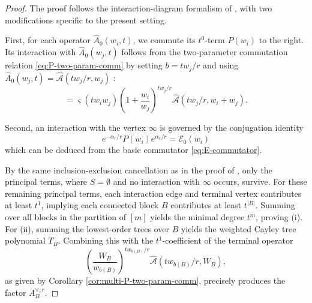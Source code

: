 \documentclass[letterpaper,12pt]{amsart}
\theoremstyle{definition}
\newcommand{\Ecal}{\mathcal E}
\newcommand{\vars}{\varsigma}
\numberwithin{equation}{section}
\begin{document}
\begin{proof}
The proof follows the interaction-diagram formalism of \cite{OP3}, with two modifications specific to the present setting.

First, for each operator $\widehat A_0(w_i,t)$, we commute its  $t^0$-term $P(w_i)$ to the right. Its interaction with $\widehat A_0(w_j,t)$ follows from the two-parameter commutation relation \eqref{eq:P-two-param-comm} by setting $b=tw_j/r$ and using \( 
\widehat A_0(w_j,t) = \widehat{\mathcal A}(tw_j/r,w_j) 
\)
:
\begin{equation*}
[P(w_i),\widehat A_0(w_j,t)]=\vars(tw_iw_j) \left(1+\frac{w_i}{w_j}\right)^{tw_j/r} \widehat{\mathcal{A}}(tw_j/r,w_i+w_j).
\end{equation*}

Second, an interaction with the vertex $\infty$ is governed by the conjugation identity \begin{equation*} 
e^{-\alpha_r/r}P(w_i)e^{\alpha_r/r} = \Ecal_0(w_i)
\end{equation*}
which can be deduced from the basic commutator \eqref{eq:E-commutator}.

By the same inclusion-exclusion cancellation as in the proof of \cite[Proposition 4.1]{OP3}, only the principal terms, where $S = \emptyset$ and no interaction with $\infty$ occurs, survive. For these remaining principal terms, each interaction edge and terminal vertex contributes at least $t^1$, implying each connected block $B$ contributes at least $t^{|B|}$. Summing over all blocks in the partition of $[m]$ yields the minimal degree $t^m$, proving (i). For (ii), summing the lowest-order trees over $B$ yields the weighted Cayley tree polynomial $T_B$. Combining this with the $t^1$-coefficient of the terminal operator
\[
  \left(\frac{W_B}{w_{b(B)}}\right)^{tw_{b(B)}/r} \widehat{\mathcal{A}} \left(tw_{b(B)}/r,W_B\right),
\]
as given by Corollary \ref{cor:multi-P-two-param-comm}, precisely produces the factor $A^{\vee,r}_B$. 
\end{proof}
\end{document}
